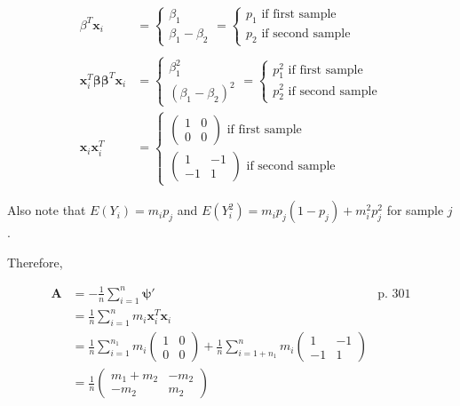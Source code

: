 \documentclass[
  letterpaper,
  DIV=11,
  numbers=noendperiod]{scrreprt}
\begin{document}
\[\begin{aligned}
\beta^T \mathbf x_i &= \begin{cases} \beta_1  \\
\beta_1 - \beta_2 \end{cases}
= \begin{cases} p_1 \text{ if first sample} \\
p_2 \text{ if second sample}\end{cases} \\ \\ 
\mathbf x_i^T \boldsymbol \beta \boldsymbol \beta^T\mathbf x_i &= \begin{cases}
\beta_1^2  \\
(\beta_1 - \beta_2)^2 \end{cases}
=\begin{cases}
p_1^2 \text{ if first sample} \\
p_2^2 \text{ if second sample}\end{cases} \\
\mathbf x_i \mathbf x_i^T &= \begin{cases}
\begin{pmatrix} 1 & 0 \\ 0 & 0 \end{pmatrix} \text{ if first sample} \\
\begin{pmatrix} 1 & -1 \\ -1 & 1 \end{pmatrix} \text{ if second sample}
\end{cases}
\end{aligned}\]

Also note that \(E(Y_i) =m_ip_j\) and
\(E(Y_i^2) = m_ip_j(1-p_j) + m_i^2p_j^2\) for sample \(j\).

Therefore,

\[\begin{aligned}
\mathbf A &= - \frac 1 n \sum_{i=1}^n \boldsymbol \psi' &\text{p. 301}\\
&= \frac 1 n \sum_{i=1}^n m_i \mathbf x_i^T \mathbf x_i \\
&= \frac 1 n \sum_{i=1}^{n_1} m_i \begin{pmatrix} 1 & 0 \\ 0 & 0 \end{pmatrix} + \frac 1 n \sum_{i=1+n_1}^{n} m_i \begin{pmatrix} 1 & -1 \\ -1 & 1 \end{pmatrix} \\
&= \frac 1 n \begin{pmatrix} m_1+m_2 & -m_2 \\ -m_2 & m_2 \end{pmatrix}
\end{aligned}\]
\end{document}
